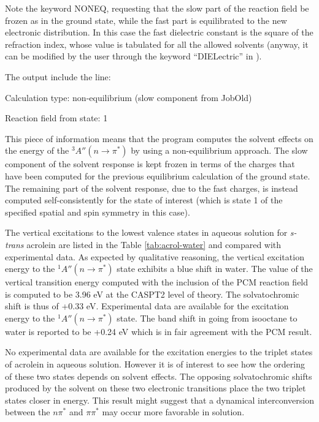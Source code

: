 Note the  keyword NONEQ, requesting that the slow part of the reaction
field be frozen as in the ground state, while the fast part is
equilibrated to the new electronic distribution. In this case the fast
dielectric constant is the square of the refraction index, whose value
is tabulated for all the allowed solvents (anyway, it can be modified by
the user through the keyword ``DIELectric'' in ).

The  output include the line:

\begin{sourcelisting}

Calculation type: non-equilibrium (slow component from JobOld)

 Reaction field from state:            1

\end{sourcelisting}

This piece of information means that the program computes the solvent
effects on the energy of the $^3A''(n\rightarrow\pi^*)$ 
by using a non-equilibrium approach.
The slow component of the solvent response is kept frozen in terms of the charges
that have been computed for the previous equilibrium calculation of
the ground state. The remaining part of the solvent response,
due to the fast charges, is instead computed self-consistently for the
state of interest (which is state 1 of the specified spatial and spin symmetry in this case).

The vertical excitations to the lowest valence states
in aqueous solution for {\em s-trans} acrolein are 
listed in the Table \ref{tab:acrol-water} and compared 
with experimental data.
As expected by qualitative reasoning, the vertical excitation energy to the 
$^1A''(n\rightarrow\pi^*)$ state exhibits a blue shift in water.
The value of the vertical transition energy computed with the inclusion of the 
PCM reaction field is computed to be 3.96 eV at the CASPT2 level of theory.
The solvatochromic shift is thus of +0.33 eV. 
Experimental data are available for the 
excitation energy to the $^1A''(n\rightarrow\pi^*)$ state. The band shift in 
going from isooctane to water is reported to be +0.24 eV which is in fair 
agreement with the PCM result.

No experimental data are available for the excitation energies to the triplet 
states of acrolein in aqueous solution. However it is of interest to see how 
the ordering of these two states depends on solvent effects.
The opposing solvatochromic shifts produced by the solvent on these two electronic transitions
place the two triplet states closer in energy.
This result might suggest that a dynamical interconversion between
the $n\pi^*$ and $\pi\pi^*$ may occur more favorable in solution.


